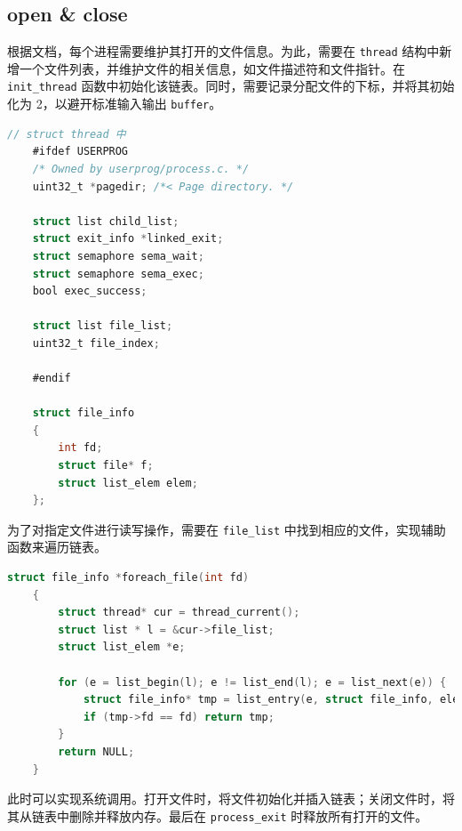 \documentclass{article}
\begin{document}
\subsection{open \& close}

根据文档，每个进程需要维护其打开的文件信息。为此，需要在 \texttt{thread} 结构中新增一个文件列表，并维护文件的相关信息，如文件描述符和文件指针。在 \texttt{init\_thread} 函数中初始化该链表。同时，需要记录分配文件的下标，并将其初始化为 2，以避开标准输入输出 \texttt{buffer}。

\begin{lstlisting}[language=C]
	// struct thread 中
	#ifdef USERPROG
	/* Owned by userprog/process.c. */
	uint32_t *pagedir; /*< Page directory. */
	
	struct list child_list;
	struct exit_info *linked_exit;
	struct semaphore sema_wait;
	struct semaphore sema_exec;
	bool exec_success;
	
	struct list file_list;
	uint32_t file_index;
	
	#endif
	
	struct file_info
	{
		int fd;
		struct file* f;
		struct list_elem elem;
	};
\end{lstlisting}

为了对指定文件进行读写操作，需要在 \texttt{file\_list} 中找到相应的文件，实现辅助函数来遍历链表。

\begin{lstlisting}[language=C]
	struct file_info *foreach_file(int fd)
	{
		struct thread* cur = thread_current();
		struct list * l = &cur->file_list;
		struct list_elem *e;
		
		for (e = list_begin(l); e != list_end(l); e = list_next(e)) { 
			struct file_info* tmp = list_entry(e, struct file_info, elem); 
			if (tmp->fd == fd) return tmp; 
		} 
		return NULL; 
	}
\end{lstlisting}

此时可以实现系统调用。打开文件时，将文件初始化并插入链表；关闭文件时，将其从链表中删除并释放内存。最后在 \texttt{process\_exit} 时释放所有打开的文件。
\end{document}
